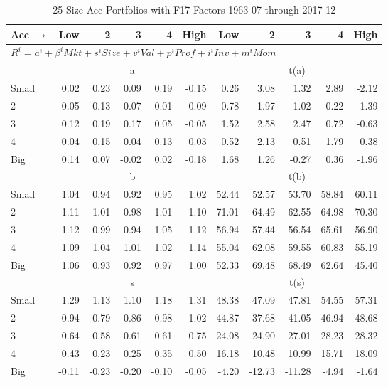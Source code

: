 
\begin{table}[!ht]
\footnotesize
\centering
\caption{25-Size-Acc Portfolios with F17 Factors 1963-07 through 2017-12}
\begin{tabular}{lrrrrrrrrrr}
  \toprule
    
    Acc $\rightarrow$ & Low & 2 & 3 & 4 & High & Low & 2 & 3 & 4 & High  \\ 
  \midrule
  \multicolumn{11}{l}{$R^i=a^i+\beta^iMkt+s^iSize+v^iVal+p^iProf+i^iInv+m^iMom$}  \\
  
     & \multicolumn{5}{c}{a} & \multicolumn{5}{c}{t(a)}   \\
     \cmidrule(r){2-6} \cmidrule(r){7-11} 
    Small  & 0.02  & 0.23  & 0.09  & 0.19  & -0.15  & 0.26  & 3.08  & 1.32  & 2.89  & -2.12   \\
    2  & 0.05  & 0.13  & 0.07  & -0.01  & -0.09  & 0.78  & 1.97  & 1.02  & -0.22  & -1.39   \\
    3  & 0.12  & 0.19  & 0.17  & 0.05  & -0.05  & 1.52  & 2.58  & 2.47  & 0.72  & -0.63   \\
    4  & 0.04  & 0.15  & 0.04  & 0.13  & 0.03  & 0.52  & 2.13  & 0.51  & 1.79  & 0.38   \\
    Big  & 0.14  & 0.07  & -0.02  & 0.02  & -0.18  & 1.68  & 1.26  & -0.27  & 0.36  & -1.96   \\
    
  
     & \multicolumn{5}{c}{b} & \multicolumn{5}{c}{t(b)}   \\
     \cmidrule(r){2-6} \cmidrule(r){7-11} 
    Small  & 1.04  & 0.94  & 0.92  & 0.95  & 1.02  & 52.44  & 52.57  & 53.70  & 58.84  & 60.11   \\
    2  & 1.11  & 1.01  & 0.98  & 1.01  & 1.10  & 71.01  & 64.49  & 62.55  & 64.98  & 70.30   \\
    3  & 1.12  & 0.99  & 0.94  & 1.05  & 1.12  & 56.94  & 57.44  & 56.54  & 65.61  & 56.90   \\
    4  & 1.09  & 1.04  & 1.01  & 1.02  & 1.14  & 55.04  & 62.08  & 59.55  & 60.83  & 55.19   \\
    Big  & 1.06  & 0.93  & 0.92  & 0.97  & 1.00  & 52.33  & 69.48  & 68.49  & 62.64  & 45.40   \\
    
  
     & \multicolumn{5}{c}{s} & \multicolumn{5}{c}{t(s)}   \\
     \cmidrule(r){2-6} \cmidrule(r){7-11} 
    Small  & 1.29  & 1.13  & 1.10  & 1.18  & 1.31  & 48.38  & 47.09  & 47.81  & 54.55  & 57.31   \\
    2  & 0.94  & 0.79  & 0.86  & 0.98  & 1.02  & 44.87  & 37.68  & 41.05  & 46.94  & 48.68   \\
    3  & 0.64  & 0.58  & 0.61  & 0.61  & 0.75  & 24.08  & 24.90  & 27.01  & 28.23  & 28.32   \\
    4  & 0.43  & 0.23  & 0.25  & 0.35  & 0.50  & 16.18  & 10.48  & 10.99  & 15.71  & 18.09   \\
    Big  & -0.11  & -0.23  & -0.20  & -0.10  & -0.05  & -4.20  & -12.73  & -11.28  & -4.94  & -1.64   \\
    

\end{tabular}
\end{table}
